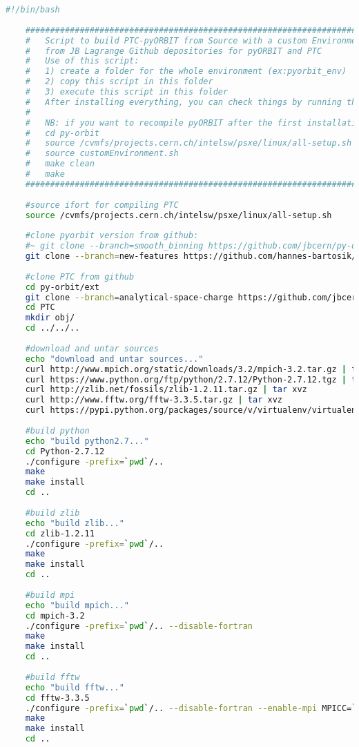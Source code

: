\documentclass[a4paper]{cernatsnote}
\begin{document}
	\begin{lstlisting}[language=bash]
	#!/bin/bash
	
	#######################################################################
	#   Script to build PTC-pyORBIT from Source with a custom Environment
	#   from JB Lagrange Github depositories for pyORBIT and PTC
	#   Use of this script:
	#   1) create a folder for the whole environment (ex:pyorbit_env)
	#   2) copy this script in this folder
	#   3) execute this script in this folder
	#   After installing everything, you can check things by running the examples in py-orbit/examples/
	#
	#   NB: if you want to recompile pyORBIT after the first installation, you need to use:
	#	cd py-orbit
	#	source /cvmfs/projects.cern.ch/intelsw/psxe/linux/all-setup.sh
	#	source customEnvironment.sh
	#	make clean
	#	make
	#######################################################################
	
	#source ifort for compiling PTC
	source /cvmfs/projects.cern.ch/intelsw/psxe/linux/all-setup.sh
	
	#clone pyorbit version from github:
	#~ git clone --branch=smooth_binning https://github.com/jbcern/py-orbit.git
	git clone --branch=new-features https://github.com/hannes-bartosik/py-orbit.git
	
	#clone PTC from github
	cd py-orbit/ext
	git clone --branch=analytical-space-charge https://github.com/jbcern/PTC.git
	cd PTC
	mkdir obj/
	cd ../../..
	
	#download and untar sources
	echo "download and untar sources..."
	curl http://www.mpich.org/static/downloads/3.2/mpich-3.2.tar.gz | tar xvz
	curl https://www.python.org/ftp/python/2.7.12/Python-2.7.12.tgz | tar xvz
	curl http://zlib.net/fossils/zlib-1.2.11.tar.gz | tar xvz
	curl http://www.fftw.org/fftw-3.3.5.tar.gz | tar xvz
	curl https://pypi.python.org/packages/source/v/virtualenv/virtualenv-15.0.0.tar.gz  | tar xvz
	
	#build python
	echo "build python2.7..."
	cd Python-2.7.12
	./configure -prefix=`pwd`/..
	make
	make install
	cd ..
	
	#build zlib
	echo "build zlib..."
	cd zlib-1.2.11
	./configure -prefix=`pwd`/..
	make
	make install
	cd ..
	
	#build mpi
	echo "build mpich..."
	cd mpich-3.2
	./configure -prefix=`pwd`/.. --disable-fortran
	make
	make install
	cd ..
	
	#build fftw
	echo "build fftw..."
	cd fftw-3.3.5
	./configure -prefix=`pwd`/.. --disable-fortran --enable-mpi MPICC=`pwd`/../bin/mpicc
	make
	make install
	cd ..
	

\end{lstlisting}
\end{document}
